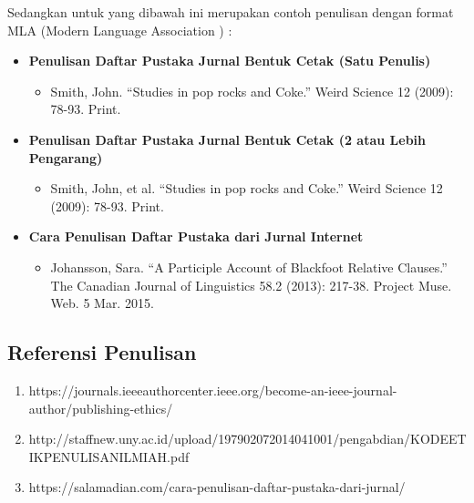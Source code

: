 Sedangkan untuk yang dibawah ini merupakan contoh penulisan dengan format MLA (Modern Language Association ) :

\begin{itemize}
    \item \textbf{Penulisan Daftar Pustaka Jurnal Bentuk Cetak (Satu Penulis)}
    \begin{itemize}
        \item Smith, John. “Studies in pop rocks and Coke.” Weird Science 12 (2009): 78-93. Print.
    \end{itemize}
    \item \textbf{Penulisan Daftar Pustaka Jurnal Bentuk Cetak (2 atau Lebih Pengarang)}
    \begin{itemize}
        \item Smith, John, et al. “Studies in pop rocks and Coke.” Weird Science 12 (2009): 78-93. Print.        
    \end{itemize}
    \item \textbf{Cara Penulisan Daftar Pustaka dari Jurnal Internet}
    \begin{itemize}
        \item Johansson, Sara. “A Participle Account of Blackfoot Relative Clauses.” The Canadian Journal of Linguistics 58.2 (2013): 217-38. Project Muse. Web. 5 Mar. 2015.
    \end{itemize}
\end{itemize}


\subsection{Referensi Penulisan}

\begin{enumerate}
    \item https://journals.ieeeauthorcenter.ieee.org/become-an-ieee-journal-author/publishing-ethics/
    \item http://staffnew.uny.ac.id/upload/197902072014041001/pengabdian/KODEETIKPENULISANILMIAH.pdf
    \item https://salamadian.com/cara-penulisan-daftar-pustaka-dari-jurnal/
\end{enumerate}
